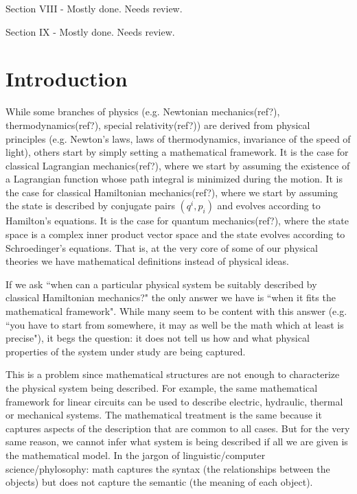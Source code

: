 \documentclass[aps,pra,10pt,twocolumn,floatfix,nofootinbib]{revtex4-1}
\numberwithin{equation}{section}
\theoremstyle{definition}
\begin{document}
Section VIII - Mostly done. Needs review.

Section IX - Mostly done. Needs review.

\section{Introduction}

While some branches of physics (e.g. Newtonian mechanics(ref?), thermodynamics(ref?), special relativity(ref?)) are derived from physical principles (e.g. Newton's laws, laws of thermodynamics, invariance of the speed of light), others start by simply setting a mathematical framework. It is the case for classical Lagrangian mechanics(ref?), where we start by assuming the existence of a Lagrangian function whose path integral is minimized during the motion. It is the case for classical Hamiltonian mechanics(ref?), where we start by assuming the state is described by conjugate pairs $(q^i, p_i)$ and evolves according to Hamilton's equations. It is the case for quantum mechanics(ref?), where the state space is a complex inner product vector space and the state evolves according to Schroedinger's equations. That is, at the very core of some of our physical theories we have mathematical definitions instead of physical ideas.

If we ask ``when can a particular physical system be suitably described by classical Hamiltonian mechanics?" the only answer we have is ``when it fits the mathematical framework". While many seem to be content with this answer (e.g. ``you have to start from somewhere, it may as well be the math which at least is precise"), it begs the question: it does not tell us how and what physical properties of the system under study are being captured.

This is a problem since mathematical structures are not enough to characterize the physical system being described. For example, the same mathematical framework for linear circuits can be used to describe electric, hydraulic, thermal or mechanical systems.\cite{Roland,Barron,Borutzky} The mathematical treatment is the same because it captures aspects of the description that are common to all cases. But for the very same reason, we cannot infer what system is being described if all we are given is the mathematical model. In the jargon of linguistic/computer science/phylosophy\cite{Freiding,Friedman}: math captures the syntax (the relationships between the objects) but does not capture the semantic (the meaning of each object).
\end{document}
